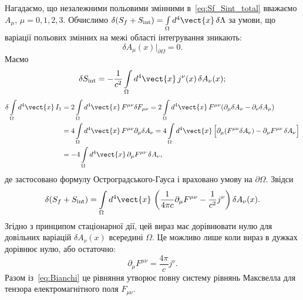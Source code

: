 Нагадаємо, що незалежними польовими змінними в~\eqref{eq:Sf_Sint_total} вважаємо $A_{\mu}$, $\mu=0,1,2,3$. Обчислимо $\delta(S_f+S_{\text{int}})=\int\limits_{\Omega}d^4\vect{x}\,\delta\Lambda$ за умови, що варіації польових змінних на межі області інтегрування зникають:
\begin{equation*}
    \delta A_{\mu}(x)\big|_{\partial\Omega} = 0.
\end{equation*}
Маємо
\begin{equation*}
    \delta S_{\text{int}} = -\frac{1}{c^2}\int\limits_{\Omega}d^4\vect{x}\,j^{\nu}(x)\,\delta A_{\nu}(x);
\end{equation*}
\begin{align*}
    \delta\int\limits_{\Omega}d^4\vect{x}\,I_1
    &= 2\int\limits_{\Omega}d^4\vect{x}\,F^{\mu\nu}\delta F_{\mu\nu}
    = 2\int\limits_{\Omega}d^4\vect{x}\,F^{\mu\nu}(\partial_{\mu}\delta A_{\nu}
    - \partial_{\nu}\delta A_{\mu}) \\
    &= 4\int\limits_{\Omega}d^4\vect{x}\,F^{\mu\nu}\partial_{\mu}\delta A_{\nu}
    = 4\int\limits_{\Omega}d^4\vect{x}\,\Big[\partial_{\mu}(F^{\mu\nu}\delta A_{\nu})
    - \partial_{\mu}F^{\mu\nu}\,\delta A_{\nu}\Big] \\
    &= -4\int\limits_{\Omega}d^4\vect{x}\,\partial_{\mu}F^{\mu\nu}\,\delta A_{\nu},
\end{align*}
де застосовано формулу Остроградського-Гауса і враховано умову на $\partial\Omega$. Звідси
\begin{equation*}
    \delta(S_f + S_{\text{int}})
    = \int\limits_{\Omega}d^4\vect{x}\,\left(\frac{1}{4\pi c}\partial_{\mu}F^{\mu\nu}
    - \frac{1}{c^2}j^{\nu}\right)\delta A_{\nu}(x).
\end{equation*}
Згідно з принципом стаціонарної дії, цей вираз має дорівнювати нулю для довільних варіацій $\delta A_{\nu}(x)$ всередині $\Omega$. Це можливо лише коли вираз в дужках дорівнює нулю, або остаточно:
\begin{equation}\label{eq:Maxwell_variational}
    \partial_{\mu}F^{\mu\nu} = \frac{4\pi}{c}j^{\nu}.
\end{equation}
Разом із~\eqref{eq:Bianchi} це рівняння утворює повну систему рівнянь Максвелла для тензора електромагнітного поля $F_{\mu\nu}$.